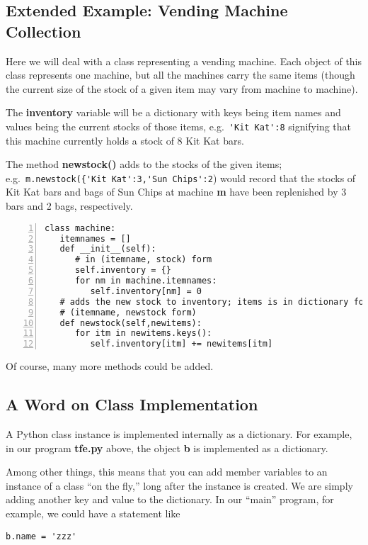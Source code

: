 \subsection{Extended Example:  Vending Machine Collection}

Here we will deal with a class representing a vending machine.  Each
object of this class represents one machine, but all the machines carry
the same items (though the current size of the stock of a given item may
vary from machine to machine).

The {\bf inventory} variable will be a dictionary with keys being item
names and values being the current stocks of those items, e.g.\
\lstinline{'Kit Kat':8} signifying that this machine currently holds a
stock of 8 Kit Kat bars.

The method {\bf newstock()} adds to the stocks of the given items; e.g.\
\lstinline{m.newstock({'Kit Kat':3,'Sun Chips':2}) would record that the
stocks of Kit Kat bars and bags of Sun Chips at machine {\bf m} have
been replenished by 3 bars and 2 bags, respectively.

\begin{lstlisting}[numbers=left]
class machine:
   itemnames = []
   def __init__(self):
      # in (itemname, stock) form
      self.inventory = {}
      for nm in machine.itemnames:
         self.inventory[nm] = 0
   # adds the new stock to inventory; items is in dictionary form,
   # (itemname, newstock form)
   def newstock(self,newitems):
      for itm in newitems.keys():
         self.inventory[itm] += newitems[itm]
\end{lstlisting}

Of course, many more methods could be added.

\subsection{A Word on Class Implementation}

A Python class instance is implemented internally as a dictionary.  For
example, in our program {\bf tfe.py} above, the object {\bf b} is
implemented as a dictionary.  

Among other things, this means that you can add member variables to an
instance of a class ``on the fly,'' long after the instance is created.
We are simply adding another key and value to the dictionary.  In our
``main'' program, for example, we could have a statement like

\begin{Verbatim}[fontsize=\relsize{-2}]
b.name = 'zzz' 
\end{Verbatim}

